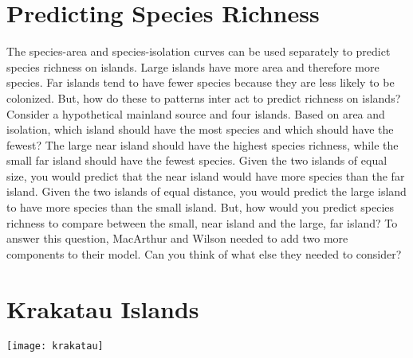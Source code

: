 \documentclass{tufte-handout}
\begin{document}
\section{Predicting Species Richness}
\begin{marginfigure}%
	\end{marginfigure} 

The species-area and species-isolation curves can be used separately to predict species richness on islands. Large islands have more area and therefore more species. Far islands tend to have fewer species because they are less likely to be colonized.  But, how do these to patterns inter act to predict richness on islands? 
Consider a hypothetical mainland source and four islands. Based on area and isolation, which island should have the most species and which should have the fewest? The large near island should have the highest species richness, while the small far island should have the fewest species.  Given the two islands of equal size, you would predict that the near island would have more species than the far island. Given the two islands of equal distance, you would predict the large island to have more species than the small island.  But, how would you predict species richness to compare between the small, near island and the large, far island?  To answer this question, MacArthur and Wilson needed to add two more components to their model. Can you think of what else they needed to consider?

\section{Krakatau Islands}

\begin{marginfigure}%
	\centering
	\texttt{[image: krakatau]}
\end{marginfigure} 
\end{document}
